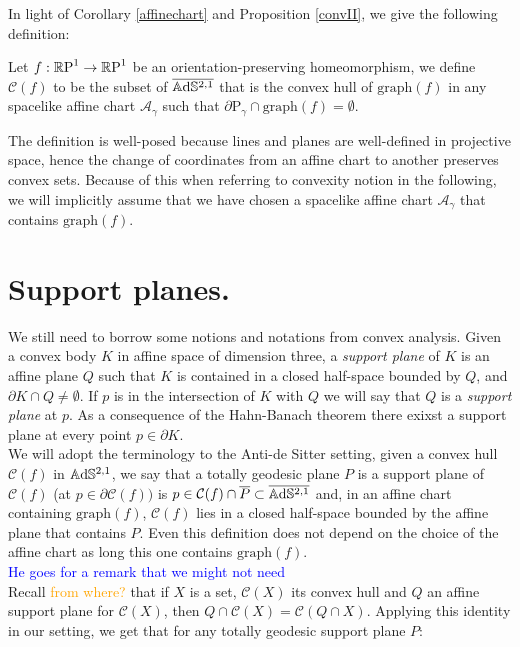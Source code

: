 In light of Corollary \ref{affinechart} and Proposition \ref{convII}, we give the following definition: 
\begin{definition}
    Let $f:\S\to\S$ be an orientation-preserving homeomorphism, we define $\mathcal{C}(f)$ to be the subset of $\overline{\A^{2,1}}$ that is the convex hull of $\text{graph}(f)$ in any spacelike affine chart $\mathcal{A}_\gamma$ such that $\partial\text{P}_\gamma\cap\text{graph}(f)=\emptyset.$
\end{definition}

The definition is well-posed because lines and planes are well-defined in projective space, hence the change of coordinates from an affine chart to another preserves convex sets. Because of this when referring to convexity notion in the following, we will implicitly assume that we have chosen a spacelike affine chart $\mathcal{A}_\gamma$ that contains $\text{graph}(f)$.

\section{Support planes.}
We still need to borrow some notions and notations from convex analysis. Given a convex body $K$ in affine space of dimension three, a \textit{support plane} of $K$ is an affine plane $Q$ such that $K$ is contained in a closed half-space bounded by $Q$, and $\partial K\cap Q\neq\emptyset.$ If $p$ is in the intersection of $K$ with $Q$ we will say that $Q$ is a \textit{support plane} at $p$. As a consequence of the Hahn-Banach theorem there exixst a support plane at every point $p\in\partial K.$ \\
We will adopt the terminology to the Anti-de Sitter setting, given a convex hull $\mathcal{C}(f)$ in $\A^{2,1}$, we say that a totally geodesic plane $P$ is a support plane of $\mathcal{C}(f)$ (at $p\in\partial\mathcal{C}(f))$ is $p\in\mathcal{C}(f)\cap \overline{P}\subset\overline{\A^{2,1}}$ and, in an affine chart containing $\text{graph}(f)$, $\mathcal{C}(f)$ lies in a closed half-space bounded by the affine plane that contains $P$. Even this definition does not depend on the choice of the affine chart as long this one contains $\text{graph}(f)$.\\ 

\textcolor{blue}{He goes for a remark that we might not need}\\

Recall \textcolor{orange}{from where?} that if $X$ is a set, $\mathcal{C}(X)$ its convex hull and $Q$ an affine support plane for $\mathcal{C}(X)$, then $Q\cap\mathcal{C}(X)=\mathcal{C}(Q\cap X).$ Applying this identity in our setting, we get that for any totally geodesic support plane $P$: 

